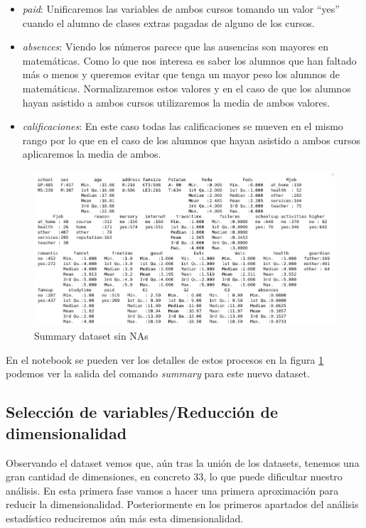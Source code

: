 \documentclass[12pt,a4paper]{article}
\begin{document}
\begin{itemize}
	\item \textit{paid}: Unificaremos las variables de ambos cursos tomando un valor ``yes'' cuando el alumno de clases extras pagadas de alguno de los cursos. 
	\item \textit{absences}: Viendo los números parece que las ausencias son mayores en matemáticas. Como lo que nos interesa es saber los alumnos que han faltado más o menos y queremos evitar que tenga un mayor peso los alumnos de matemáticas. Normalizaremos estos valores y en el caso de que los alumnos hayan asistido a ambos cursos utilizaremos la media de ambos valores.
	 \item \textit{calificaciones}: En este caso todas las calificaciones se mueven en el mismo rango por lo que en el caso de los alumnos que hayan asistido a ambos cursos aplicaremos la media de ambos. 
\end{itemize}
 \begin{figure}[ht!]
	\centering
	\includegraphics[trim = 0mm 0mm 0mm 0mm, clip,scale=0.4]{images/summary_nonas}
	\caption{Summary dataset sin NAs}
	\label{fig:sum2}
\end{figure}



En el notebook se pueden ver los detalles de estos procesos en la figura \ref{fig:sum2} podemos ver la salida del comando \textit{summary} para este nuevo dataset.



\subsection{Selección de variables/Reducción de dimensionalidad}
Observando el dataset vemos que, aún tras la unión de los datasets, tenemos una gran cantidad de dimensiones, en concreto 33, lo que puede dificultar nuestro análisis. En esta primera fase vamos a hacer una primera aproximación para reducir la dimensionalidad. Posteriormente en los primeros apartados del análisis estadístico reduciremos aún más esta dimensionalidad.
\end{document}
